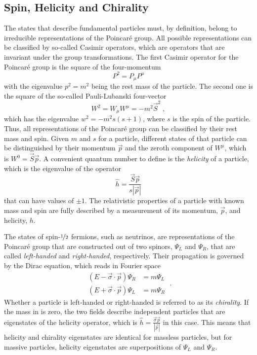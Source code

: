 \subsection{Spin, Helicity and Chirality}
The states that describe fundamental particles must, by definition, belong to irreducible representations of the Poincar\'{e} group.
All possible representations can be classified by so-called Casimir operators, which are operators that are invariant under the group transformations.
The first Casimir operator for the Poincar\'{e} group is the square of the four-momentum
\begin{equation}
    P^2 = P_\mu P^\mu
\end{equation}
with the eigenvalue $p^2 = m^2$ being the rest mass of the particle.
The second one is the square of the so-called Pauli-Lubanski four-vector
\begin{equation}
    W^2 = W_\mu W^\mu = -m^2 \vec{S}^2\;,
\end{equation}
which has the eigenvalue $w^2 = -m^2 s(s+1)$, where $s$ is the spin of the particle.
Thus, all representations of the Poincar\'{e} group can be classified by their rest mass and spin.
Given $m$ and $s$ for a particle, different states of that particle can be distinguished by their momentum $\vec{p}$ and the zeroth component of $W^\mu$, which is $W^0 = \vec{S}\vec{p}$.
A convenient quantum number to define is the \emph{helicity} of a particle, which is the eigenvalue of the operator
\begin{equation}
    \hat{h} = \frac{\vec{S}\vec{p}}{s |\vec{p}|}
\end{equation}
that can have values of $\pm1$.
The relativistic properties of a particle with known mass and spin are fully described by a measurement of its momentum, $\vec{p}$, and helicity, $h$.

The states of spin-$\nicefrac{1}{2}$ fermions, such as neutrinos, are representations of the Poincar\'{e} group that are constructed out of two spinors, $\Psi_L$ and $\Psi_R$, that are called \emph{left-handed} and \emph{right-handed}, respectively.
Their propagation is governed by the Dirac equation, which reads in Fourier space
\begin{equation}
\begin{aligned}
    (E - \vec{\sigma}\cdot \vec{p})\Psi_R &= m \Psi_L \\
    (E + \vec{\sigma}\cdot \vec{p})\Psi_L &= m \Psi_R
\end{aligned}\;.\label{eq:dirac-chirality}
\end{equation}
Whether a particle is left-handed or right-handed is referred to as its \emph{chirality}. If the mass in  is zero, the two fields describe independent particles that are eigenstates of the helicity operator, which is $\hat{h}=\frac{\vec{\sigma}\vec{p}}{|\vec{p}|}$ in this case.
This means that helicity and chirality eigenstates are identical for massless particles, but for massive particles, helicity eigenstates are superpositions of $\Psi_L$ and $\Psi_R$.

